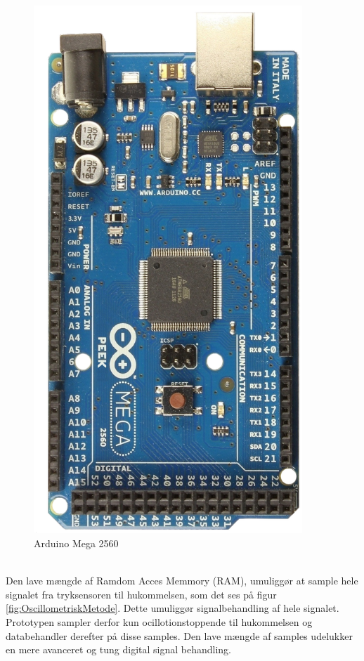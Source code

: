 \begin{minipage}[t]{0.4\textwidth}
	\begin{figure}[H]
		\centering
		\includegraphics[width = 0.9\textwidth]{billeder/arduinoMega2560.png}
		\caption{Arduino Mega 2560}\label{fig:arduinoMega2560}
	\end{figure}
\end{minipage}\\

Den lave mængde af Ramdom Acces Memmory (RAM), umuliggør at sample hele signalet fra tryksensoren til hukommelsen, som det ses på figur \ref{fig:OscillometriskMetode}. Dette umuliggør signalbehandling af hele signalet. Prototypen sampler derfor kun ocillotionstoppende til hukommelsen og databehandler derefter på disse samples. Den lave mængde af samples udelukker en mere avanceret og tung digital signal behandling.


